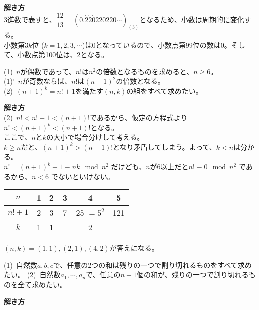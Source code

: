\documentclass[11pt]{article}
\begin{document}
\underline{\textbf{解き方}}\\
3進数で表すと、$\dfrac{12}{13} = ( 0. \dot{2} \dot{2} \dot{0} 220220 \cdots )_{(3)}$となるため、小数は周期的に変化する。\\
小数第$3k$位 ($k=1,2,3,\cdots$)は0となっているので、小数点第99位の数は0。そして、小数点第100位は、2となる。\\

\begin{tcolorbox}[mybox={東大実践模試？の動画}]
(1)\ $n$が偶数であって、$n!$は$n^2$の倍数となるものを求めると、$n \geq 6$。\\
(1)'\ $n$が奇数ならば、$n!$は$(n-1)^2$の倍数となる。\\
(2)\ $(n+1)^k = n!+1$を満たす$(n,k)$の組をすべて求めたい。
\end{tcolorbox}

\underline{\textbf{解き方}}\\
(2)\ $n! < n!+1 < (n+1)!$であるから、仮定の方程式より$n! < (n+1)^k < (n+1)!$となる。\\
ここで、$n$と$k$の大小で場合分けして考える。\\
$k \geq n$だと、$(n+1)^k > (n+1)!$となり矛盾してしまう。よって、$k < n$は分かる。\\
$n! = (n+1)^k -1 \equiv nk  \mod n^2 $ だけども、$n$が6以上だと$n! \equiv 0 \mod n^2$ であるから、$n<6$ でないといけない。

\begin{center}
\begin{tabular}{|c|c|c|c|c|c|}
\hline
$n$ & 1 & 2 & 3 & 4 & 5\\
\hline
$n!+1$ & 2 & 3 & 7 & 25 $=5^2$ & 121\\
\hline
$k$& 1& 1 & $-$ & 2 & $-$\\
\hline
\end{tabular}
\end{center}

$(n,k) = (1,1) , (2,1) , (4,2)$が答えになる。\\

\begin{tcolorbox}[mybox={東大過去問？の動画の改良}]
(1)\ 自然数$a,b,c$で、任意の2つの和は残りの一つで割り切れるものをすべて求めたい。
(2)\ 自然数$a_1 , \cdots , a_n$で、任意の$n-1$個の和が、残りの一つで割り切れるものを全て求めたい。
\end{tcolorbox}

\underline{\textbf{解き方}}\\
\end{document}
